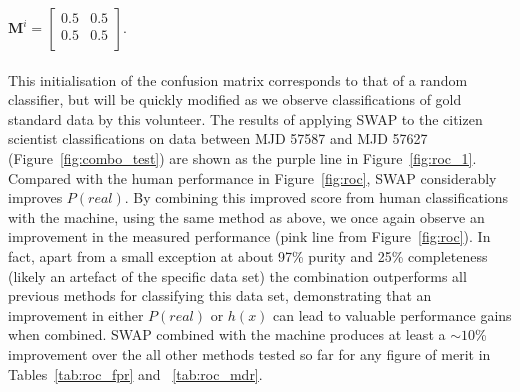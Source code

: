 \documentclass[a4paper,fleqn,usenatbib]{mnras}
\begin{document}
 $\bm{M}^i = \begin{bmatrix}
                        0.5&0.5\\
                        0.5&0.5 \\
                        \end{bmatrix}$.\\
\\
This initialisation of the confusion matrix corresponds to that of a random classifier, but will be quickly modified as we observe classifications of gold standard data by this volunteer.  The results of applying SWAP to the citizen scientist classifications on data between MJD 57587 and MJD 57627 (Figure~\ref{fig:combo_test}) are shown as the purple line in Figure~\ref{fig:roc_1}.  Compared with the human performance in Figure~\ref{fig:roc}, SWAP considerably improves $P(real)$.  By combining this improved score from human classifications with the machine, using the same method as above, we once again observe an improvement in the measured performance (pink line from Figure~\ref{fig:roc}).  In fact, apart from a small exception at about 97\% purity and 25\% completeness (likely an artefact of the specific data set) the combination outperforms all previous methods for classifying this data set, demonstrating that an improvement in either $P(real)$ or $h(x)$ can lead to valuable performance gains when combined.  SWAP combined with the machine produces at least a $\sim10$\% improvement over the all other methods tested so far for any figure of merit in Tables~\ref{tab:roc_fpr} and ~\ref{tab:roc_mdr}.
\end{document}
